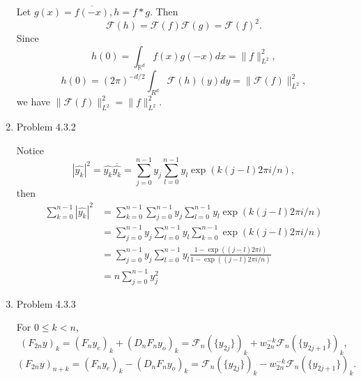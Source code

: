 \documentclass{article}%
\begin{document}
\begin{enumerate}
Let $g(x) = \overline{f(-x)}, h = f\ast g$. Then
$$
\mathcal{F}(h) = \mathcal{F}(f)\mathcal{F}(g) = \mathcal{F}(f)^2.
$$
Since
$$
h(0) = \int_{\mathbb{R}^d}f(x)g(-x)dx = \lVert f\rVert_{L^2}^2,
$$
$$
h(0) = (2\pi)^{-d/2}\int_{R^d}\mathcal{F}(h)(y)dy = \lVert \mathcal{F}(f)\rVert_{L^2}^2,
$$
we have $ \lVert \mathcal{F}(f)\rVert_{L^2}^2 = \lVert f\rVert_{L^2}^2 $.

\item Problem 4.3.2

Notice
$$
|\hat{y_k}|^2 = \hat{y_k}\overline{\hat{y_k}} = \sum_{j=0}^{n-1}y_j\sum_{l=0}^{n-1}y_l \exp(k(j-l)2\pi i/n),
$$
then
$$
\begin{aligned}
\sum_{k=0}^{n-1}|\hat{y_k}|^2 &= \sum_{k=0}^{n-1}\sum_{j=0}^{n-1}y_j\sum_{l=0}^{n-1}y_l \exp(k(j-l)2\pi i/n) \\
&= \sum_{j=0}^{n-1}y_j\sum_{l=0}^{n-1}y_l\sum_{k=0}^{n-1}\exp(k(j-l)2\pi i/n) \\
&= \sum_{j=0}^{n-1}y_j\sum_{l=0}^{n-1}y_l\frac{1-\exp((j-l)2\pi i )}{1-\exp((j-l)2\pi i/n )} \\
&= n\sum_{j=0}^{n-1}y_j^2
\end{aligned}
$$


\item Problem 4.3.3

For $0\le k < n$,
$$
(F_{2n}y)_k = (F_ny_e)_k + (D_nF_ny_o)_k = \mathcal{F}_n(\{y_{2j}\})_k + w_{2n}^{-k}\mathcal{F}_n(\{y_{2j+1}\})_k,
$$
$$
(F_{2n}y)_{n+k} = (F_ny_e)_k - (D_nF_ny_o)_k = \mathcal{F}_n(\{y_{2j}\})_k - w_{2n}^{-k}\mathcal{F}_n(\{y_{2j+1}\})_k.
$$

\end{enumerate}
\end{document}
